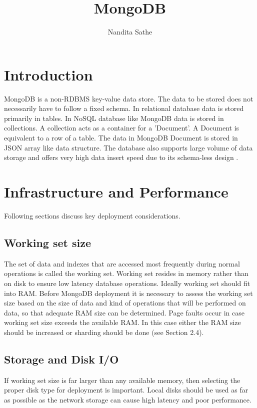 \documentclass[9pt,twocolumn,twoside]{../../styles/osajnl}
\title{MongoDB}
\author[1,*]{Nandita Sathe}
\affil[1]{School of Informatics and Computing, Bloomington, IN 47408, U.S.A.}
\affil[*]{Corresponding author: nsathe@iu.edu}
\begin{document}
\maketitle

\section{Introduction}

MongoDB is a non-RDBMS key-value data store. The data to be stored does not necessarily have to follow a fixed schema. In relational database data is stored primarily in tables. In NoSQL database like MongoDB data is stored in collections. A collection acts as a container for a 'Document'. A Document is equivalent to a row of a table. The data in MongoDB Document is stored in JSON array like data structure. The database also supports large volume of data storage and offers very high data insert speed due to its schema-less design \cite{paper-mongo1}. 

\section{Infrastructure and Performance}

Following sections discuss key deployment considerations.

\subsection{Working set size}

The set of data and indexes that are accessed most frequently during normal operations is called the working set. Working set resides in memory rather than on disk to ensure low latency database operations. Ideally working set should fit into RAM. Before MongoDB deployment it is necessary to assess the working set size based on the size of data and kind of operations that will be performed on data, so that adequate RAM size can be determined. Page faults occur in case working set size exceeds the available RAM. In this case either the RAM size should be increased or sharding should be done (see Section 2.4).   

\subsection {Storage and Disk I/O}

If working set size is far larger than any available memory, then selecting the proper disk type for deployment is important. Local disks should be used as far as possible as the network storage can cause high latency and poor performance.
\end{document}
